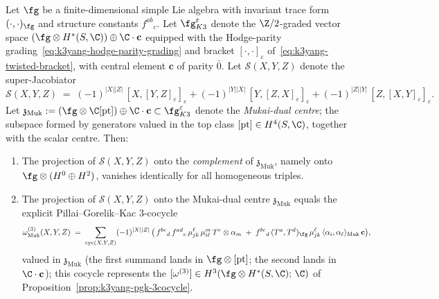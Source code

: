 \begin{theorem}
\label{thm:k3yang-jacobi-closure-super}
Let $\fg$ be a finite-dimensional simple Lie algebra with invariant
trace form $(\cdot, \cdot)_{\fg}$ and structure constants
$f^{ab}{}_c$. Let $\fg^{\varepsilon}_{K3}$ denote the $\Z/2$-graded
vector space $(\fg \otimes H^*(S, \C)) \oplus \C \cdot \mathbf c$
equipped with the Hodge-parity
grading~\eqref{eq:k3yang-hodge-parity-grading} and bracket
$[\cdot, \cdot]_{\varepsilon}$
of~\eqref{eq:k3yang-twisted-bracket}, with central element
$\mathbf c$ of parity $\bar 0$. Let $\mathcal S(X, Y, Z)$ denote the
super-Jacobiator
\begin{equation}\label{eq:k3yang-super-jacobi}
 \mathcal S(X, Y, Z)
 \;=\;
 (-1)^{|X||Z|}\,
 [X, [Y, Z]_{\varepsilon}]_{\varepsilon}
 + (-1)^{|Y||X|}\,
 [Y, [Z, X]_{\varepsilon}]_{\varepsilon}
 + (-1)^{|Z||Y|}\,
 [Z, [X, Y]_{\varepsilon}]_{\varepsilon}.
\end{equation}
Let $\mathfrak z_{\mathrm{Muk}} := (\fg \otimes \C[\mathrm{pt}])
\oplus \C \cdot \mathbf c \subset \fg^{\varepsilon}_{K3}$
denote the \emph{Mukai-dual centre}; the subspace formed by
generators valued in the top class $[\mathrm{pt}] \in H^4(S, \C)$,
together with the scalar centre. Then:
\begin{enumerate}[label=\textup{(\roman*)}]
\item The projection of $\mathcal S(X, Y, Z)$ onto the
 \emph{complement} of $\mathfrak z_{\mathrm{Muk}}$, namely onto
 $\fg \otimes (H^0 \oplus H^2)$, vanishes identically for all
 homogeneous triples.
\item The projection of $\mathcal S(X, Y, Z)$ onto the Mukai-dual
 centre $\mathfrak z_{\mathrm{Muk}}$ equals the explicit
 Pillai--Gorelik--Kac $3$-cocycle
 \begin{equation}\label{eq:k3yang-central-defect}
 \omega^{(3)}_{\mathrm{Muk}}(X, Y, Z)
 \;=\;
 \sum_{\mathrm{cyc}(X, Y, Z)}
 (-1)^{|X||Z|}\,
 \bigl(\,
 f^{bc}{}_d\,f^{ad}{}_e\,\mu^\ell_{jk}\,\mu^m_{i\ell}\,
 T^e \otimes \alpha_m
 \;+\;
 f^{bc}{}_d\,(T^a, T^d)_{\fg}\,\mu^\ell_{jk}\,
 \langle \alpha_i, \alpha_\ell\rangle_{\mathrm{Muk}}\,\mathbf c
 \bigr),
 \end{equation}
 valued in $\mathfrak z_{\mathrm{Muk}}$ (the first summand lands in
 $\fg \otimes [\mathrm{pt}]$; the second lands in
 $\C \cdot \mathbf c$); this cocycle represents the
 $[\omega^{(3)}] \in H^3(\fg \otimes H^*(S, \C);\, \C)$ of
 Proposition~\ref{prop:k3yang-pgk-3cocycle}.

\end{enumerate}
\end{theorem}
